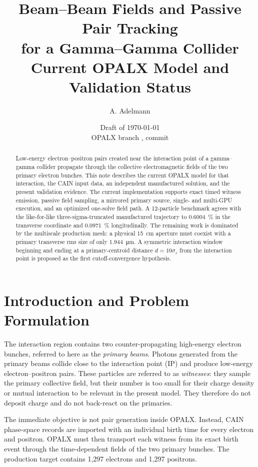 \documentclass[11pt,a4paper]{article}
\title{Beam--Beam Fields and Passive Pair Tracking\\
       for a Gamma--Gamma Collider\\[4pt]
       \large Current OPALX Model and Validation Status}
\author{A. Adelmann}
\date{Draft of \today\\
      \small OPALX branch \code{271-implement-interation-point-element},
      commit \code{df7cd6cba}}
\begin{document}
\maketitle

\begin{abstract}
Low-energy electron--positron pairs created near the interaction point of a
gamma--gamma collider propagate through the collective electromagnetic fields
of the two primary electron bunches.  This note describes the current OPALX
model for that interaction, the CAIN input data, an independent manufactured
solution, and the present validation evidence.  The current implementation
supports exact timed witness emission, passive field sampling, a mirrored
primary source, single- and multi-GPU execution, and an optimized one-solve
field path.  A 12-particle benchmark agrees with the like-for-like
three-sigma-truncated manufactured trajectory to \SI{0.6004}{\percent} in the
transverse coordinate and \SI{0.0971}{\percent} longitudinally.  The remaining
work is dominated by the multiscale production mesh: a physical
\SI{15}{\centi\metre} aperture must coexist with a primary transverse rms size
of only \SI{1.944}{\micro\metre}.  A symmetric interaction window beginning
and ending at a primary-centroid distance $d=10\sigma_z$ from the interaction
point is proposed as the first cutoff-convergence hypothesis.
\end{abstract}

\section{Introduction and Problem Formulation}

The interaction region contains two counter-propagating high-energy electron
bunches, referred to here as the \emph{primary beams}.  Photons generated from
the primary beams collide close to the interaction point (IP) and produce
low-energy electron--positron pairs.  These particles are referred to as
\emph{witnesses}: they sample the primary collective field, but their number is
too small for their charge density or mutual interaction to be relevant in the
present model.  They therefore do not deposit charge and do not back-react on
the primaries.

The immediate objective is not pair generation inside OPALX.  Instead, CAIN
phase-space records are imported with an individual birth time for every
electron and positron.  OPALX must then transport each witness from its exact
birth event through the time-dependent fields of the two primary bunches.
The production target contains 1,297 electrons and 1,297 positrons.
\end{document}
